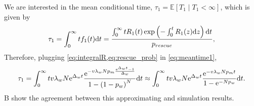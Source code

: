 \documentclass[12pt]{extarticle}
\renewcommand{\d}[1]{\ensuremath{\operatorname{d}\!{#1}}}
\renewcommand{\d}{{\rm d}}
\newcommand{\e}{{\rm e}}
\begin{document}
\begin{appendices}
We are interested in the mean conditional time, $\tau_1=\mathbb{E}\left[T_1 \mid T_1<\infty\right]$, which is given by
\begin{equation}\label{eq:meantime1}
\begin{aligned}
\tau_1 =
\int_{0}^{\infty}{t f_1(t) \d t} = 
\frac{\int_{0}^{\infty}{tR_1(t)\exp\left(-\int_0^{t}{R_1(z)\d z}\right) \d t}}{p_{rescue}},%
\end{aligned}
\end{equation}
Therefore, plugging \cref{eq:integralR,eq:rescue_prob} in \cref{eq:meantime1}, 
\begin{align}\label{eq:limitapprox_appendix}
\tau_1 = 
\int_0^\infty tv\lambda_w N\e^{\Delta_wt}\frac{\e^{-v\lambda_w N p_m\frac{\e^{\Delta_w t}-1}{\Delta_w}} }{1-\left(1-p_w\right)^N} \d t\approx
\int_{0}^{\infty} tv\lambda_w N\e^{\Delta_wt}\frac{\e^{-v\lambda_w N p_mt} }{1-\e^{-Np_w}}\d t. 
\end{align}
B show the agreement between this approximating and simulation results.
\\


\end{appendices}
\end{document}
